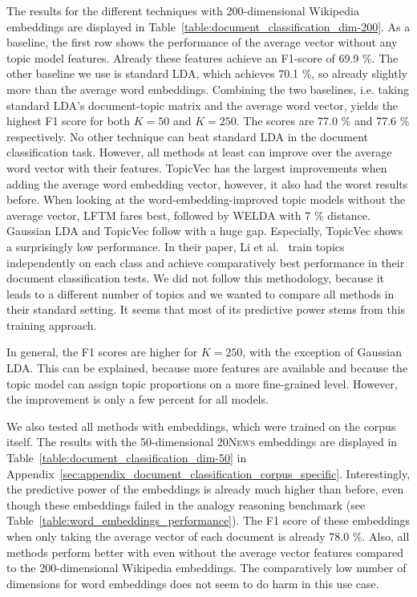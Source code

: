 \documentclass[
        a4paper,
        titlepage,
        twoside,
        parskip,
        numbers=noenddot
        ]{scrbook}
\theoremstyle{break}
\begin{document}
The results for the different techniques with 200-dimensional Wikipedia embeddings are displayed in Table~\ref{table:document_classification_dim-200}.
As a baseline, the first row shows the performance of the average vector without any topic model features.
Already these features achieve an F1-score of 69.9 \%.
The other baseline we use is standard LDA, which achieves 70.1 \%, so already slightly more than the average word embeddings.
Combining the two baselines, i.e. taking standard LDA's document-topic matrix and the average word vector, yields the highest F1 score for both $K = 50$ and $K = 250$.
The scores are 77.0 \% and 77.6 \% respectively.
No other technique can beat standard LDA in the document classification task.
However, all methods at least can improve over the average word vector with their features.
TopicVec has the largest improvements when adding the average word embedding vector, however, it also had the worst results before.
When looking at the word-embedding-improved topic models without the average vector, LFTM fares best, followed by WELDA with 7 \% distance.
Gaussian LDA and TopicVec follow with a huge gap.
Especially, TopicVec shows a surprisingly low performance.
In their paper,  Li et al.~\cite{Li2016} train topics independently on each class and achieve comparatively best performance in their document classification tests.
We did not follow this methodology, because it leads to a different number of topics and we wanted to compare all methods in their standard setting.
It seems that most of its predictive power stems from this training approach.

In general, the F1 scores are higher for $K = 250$, with the exception of Gaussian LDA.
This can be explained, because more features are available and because the topic model can assign topic proportions on a more fine-grained level.
However, the improvement is only a few percent for all models.

We also tested all methods with embeddings, which were trained on the corpus itself.
The results with the 50-dimensional \textsc{20News} embeddings are displayed in Table~\ref{table:document_classification_dim-50} in Appendix~\ref{sec:appendix_document_classification_corpus_specific}.
Interestingly, the predictive power of the embeddings is already much higher than before, even though these embeddings failed in the analogy reasoning benchmark (see Table~\ref{table:word_embeddings_performance}).
The F1 score of these embeddings when only taking the average vector of each document is already 78.0 \%.
Also, all methods perform better with even without the average vector features compared to the 200-dimensional Wikipedia embeddings.
The comparatively low number of dimensions for word embeddings does not seem to do harm in this use case.
\end{document}
